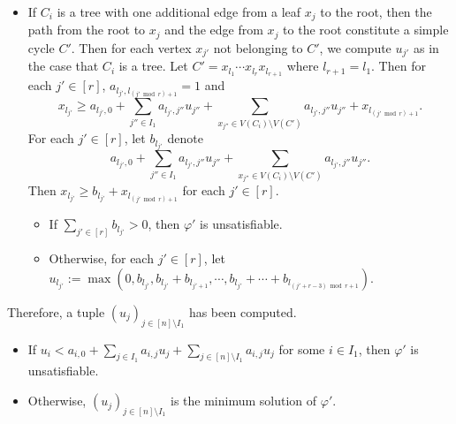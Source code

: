 \documentclass[runningheads]{llncs}
\begin{document}
{\begin{itemize}
\item If $C_i$ is a tree with one additional edge from a leaf $x_j$ to the root, then the path from the root to $x_j$ and the edge from $x_j$ to the root constitute  a simple cycle $C'$. Then for each vertex $x_{j'}$ not belonging to $C'$, we compute $u_{j'}$ as in the case that $C_i$ is a tree. Let $C' = x_{l_1} \cdots x_{l_r} x_{l_{r+1}}$ where $l_{r+1} = l_1$. Then for each $j' \in [r]$, $a_{l_{j'}, l_{(j' \bmod r)+1}} = 1$ and 
$$x_{l_{j'}} \ge a_{l_{j'},0} + \sum \limits_{j'' \in I_1} a_{l_{j'}, j''} u_{j''} + \sum \limits_{x_{j''} \in V(C_i) \setminus V(C')} a_{l_{j'}, j''}  u_{j''} + x_{l_{(j' \bmod r)+1}}.$$ 
%
For each $j' \in [r]$, let $b_{l_{j'}}$ denote 
$$a_{l_{j'},0} + \sum \limits_{j'' \in I_1} a_{l_{j'}, j''} u_{j''} + \sum \limits_{x_{j''} \in V(C_i) \setminus V(C')} a_{l_{j'}, j''}  u_{j''}.$$ 
%
Then $x_{l_{j'}} \ge b_{l_{j'}} + x_{l_{(j' \bmod r)+1}}$ for each $j' \in [r]$.
\begin{itemize}
\item If $\sum \limits_{j' \in [r]} b_{l_{j'}} > 0 $, then $\varphi'$ is unsatisfiable. 
%
\item Otherwise, for each $j' \in [r]$, let $u_{l_{j'}} := \max(0, b_{l_{j'}}, b_{l_{j'}}+ b_{l_{j'+1}}, \cdots, b_{l_{j'}} + \cdots + b_{l_{(j'+r-3) \bmod r+1}})$.
\end{itemize}
\end{itemize}

Therefore, a tuple $(u_j)_{j \in [n] \setminus I_1}$ has been computed.
\begin{itemize}
\item If $u_i < a_{i,0} + \sum \limits_{j \in I_1} a_{i, j} u_j + \sum \limits_{j \in [n] \setminus I_1} a_{i, j} u_j$ for some $i \in I_1$, then $\varphi'$ is unsatisfiable. 
%
\item Otherwise, $(u_j)_{j \in [n] \setminus I_1}$ is the minimum solution of $\varphi'$.
\end{itemize}
}
\end{document}
